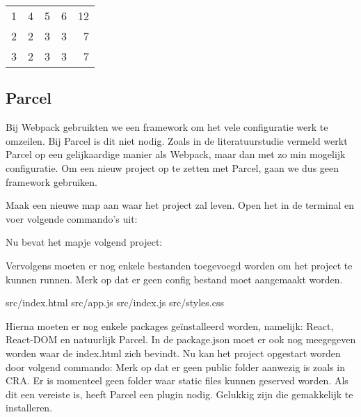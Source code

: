 \begin{table}[]
\begin{tabular}{@{}lrrrr@{}}
    \multicolumn{1}{r}{1}                                                                         & 4                                          & 5                                    & 6                                    & 12                               \\
    \multicolumn{1}{r}{2}                                                                         & 2                                          & 3                                    & 3                                    & 7                                \\
    \multicolumn{1}{r}{3}                                                                         & 2                                          & 3                                    & 3                                    & 7                                \\ \bottomrule
    \end{tabular}
    \end{table}

\subsection{Parcel}
Bij Webpack gebruikten we een framework om het vele configuratie werk te omzeilen. Bij Parcel is dit niet nodig. Zoals in de literatuurstudie vermeld werkt Parcel op een gelijkaardige manier als Webpack, maar dan met zo min mogelijk configuratie. Om een nieuw project op te zetten met Parcel, gaan we dus geen framework gebruiken.

Maak een nieuwe map aan waar het project zal leven. Open het in de terminal en voer volgende commando’s uit:

Nu bevat het mapje volgend project:

Vervolgens moeten er nog enkele bestanden toegevoegd worden om het project te kunnen runnen. Merk op dat er geen config bestand moet aangemaakt worden.

src/index.html
src/app.js
src/index.js
src/styles.css

Hierna moeten er nog enkele packages geïnstalleerd worden, namelijk: React, React-DOM en natuurlijk Parcel. In de package.json moet er ook nog meegegeven worden waar de index.html zich bevindt. Nu kan het project opgestart worden door volgend commando:
Merk op dat er geen public folder aanwezig is zoals in CRA. Er is momenteel geen folder waar static files kunnen geserved worden. Als dit een vereiste is, heeft Parcel een plugin nodig. Gelukkig zijn die gemakkelijk te installeren.

